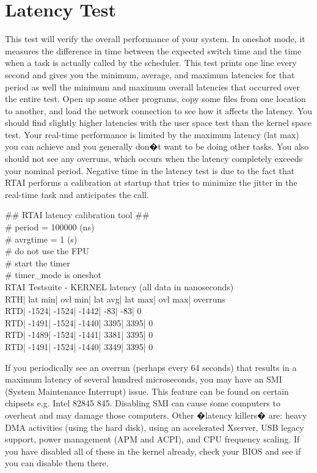 \section{Latency Test}
\label{Latency Test}
This test will verify the overall performance of your system. In oneshot mode, it measures the difference in time between the expected switch time and the time when a task is actually called by the scheduler. This test prints one line every second and gives you the minimum, average, and maximum latencies for that period as well the minimum and maximum overall latencies that occurred over the entire test. Open up some other programs, copy some files from one location to another, and load the network connection to see how it affects the latency. You should find slightly higher latencies with the user space test than the kernel space test. Your real-time performance is limited by the maximum latency (lat max) you can achieve and you generally don�t want to be doing other tasks. You also should not see any overruns, which occurs when the latency completely exceeds your nominal period. Negative time in the latency test is due to the fact that RTAI performs a calibration at startup that tries to minimize the jitter in the real-time task and anticipates the call.

\begin{maxipage}
\begin{example}
\#\# RTAI latency calibration tool \#\#\\
\# period = 100000 (ns)\\
\# avrgtime = 1 (s)\\
\# do not use the FPU\\
\# start the timer\\
\# timer\_mode is oneshot\\
RTAI Testsuite - KERNEL latency (all data in nanoseconds)\\
RTH| lat min| ovl min| lat avg| lat max| ovl max| overruns\\
RTD| -1524| -1524| -1442| -83| -83| 0\\
RTD| -1491| -1524| -1440| 3395| 3395| 0\\
RTD| -1489| -1524| -1441| 3381| 3395| 0\\
RTD| -1491| -1524| -1440| 3349| 3395| 0\\
\end{example}
\end{maxipage}

If you periodically see an overrun (perhaps every 64 seconds) that results in a maximum latency of several hundred microseconds, you may have an SMI (System Maintenance Interrupt) issue. This feature can be found on certain chipsets e.g. Intel 82845 845. Disabling SMI can cause some computers to overheat and may damage those computers. Other �latency killers� are: heavy DMA activities (using the hard disk), using an accelerated Xserver, USB legacy support, power management (APM and ACPI), and CPU frequency scaling. If you have disabled all of these in the kernel already, check your BIOS and see if you can disable them there.

